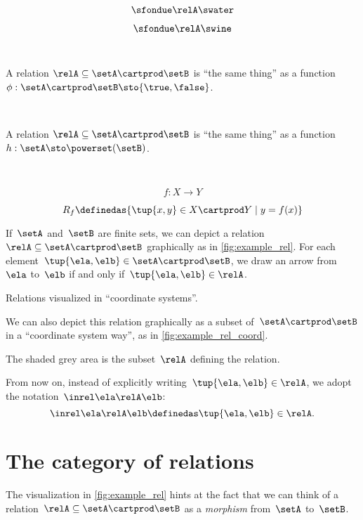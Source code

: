 {\begin{forslides}
		$$ \sfondue \relA \swater \label{eq:slides-17}$$

		$$ \sfondue \relA \swine \label{eq:slides-18}$$

		\

		A relation $\relA \subseteq \setA \cartprod \setB$ is ``the same thing'' as a function $\phi : \setA \cartprod \setB \sto \{\true, \false\}$.

		\

		A relation $\relA \subseteq \setA \cartprod \setB$ is ``the same thing'' as a function $h : \setA  \sto \powerset (\setB)$.

		\

		$$
			f : X \to Y
		$$

		$$
			R_f \definedas \{ \tup{x, y} \in X \cartprod Y \mid y = f(x) \}
		$$

	\end{forslides}
}

If~$\setA$ and~$\setB$ are finite sets, we can depict a relation~$\relA \subseteq \setA \cartprod \setB$ graphically as in \cref{fig:example_rel}.
For each element~$\tup{\ela,\elb} \in \setA \cartprod \setB$, we draw an arrow from~$\ela$ to~$\elb$ if and only if~$\tup{\ela,\elb} \in \relA$.

\begin{marginfigure}
	\centering
	\caption{Relations visualized in ``coordinate systems''.}
	\label{fig:example_rel_coord}
\end{marginfigure}

We can also depict this relation graphically as a subset of~$\setA \cartprod \setB$ in a ``coordinate system way'', as in \cref{fig:example_rel_coord}.

The shaded grey area is the subset~$\relA$ defining the relation.

\begin{remark}
	From now on, instead of explicitly writing~$\tup{\ela,\elb}\in \relA$, we adopt the notation~$\inrel \ela \relA \elb$:
	\begin{equation}
		\inrel \ela \relA \elb \definedas \tup{\ela,\elb}\in \relA.
	\end{equation}
\end{remark}

\section{The category of relations \Rel}

The visualization in \cref{fig:example_rel} hints at the fact that we can think of a relation~$\relA \subseteq \setA \cartprod \setB$ as a \emph{morphism} from~$\setA$ to~$\setB$.

